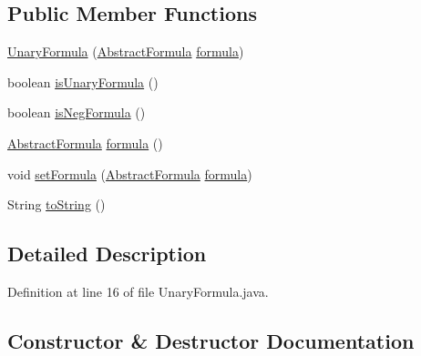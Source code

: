 \subsection*{Public Member Functions}
\begin{DoxyCompactItemize}
\item 
\hyperlink{classuran_1_1formula_1_1_unary_formula_adf82e120cae0b8fe597e3ffffaf22793}{Unary\+Formula} (\hyperlink{classuran_1_1formula_1_1_abstract_formula}{Abstract\+Formula} \hyperlink{classuran_1_1formula_1_1_unary_formula_a348d9e263106ff6085e47c01e15737e2}{formula})
\item 
boolean \hyperlink{classuran_1_1formula_1_1_unary_formula_aacf9ae3900679c8adbc5f26a92f90317}{is\+Unary\+Formula} ()
\item 
boolean \hyperlink{classuran_1_1formula_1_1_unary_formula_a1e44e55276a395446aa3615245790a95}{is\+Neg\+Formula} ()
\item 
\hyperlink{classuran_1_1formula_1_1_abstract_formula}{Abstract\+Formula} \hyperlink{classuran_1_1formula_1_1_unary_formula_a348d9e263106ff6085e47c01e15737e2}{formula} ()
\item 
void \hyperlink{classuran_1_1formula_1_1_unary_formula_a2d0a4512e7e27758ec8abbd2112623f5}{set\+Formula} (\hyperlink{classuran_1_1formula_1_1_abstract_formula}{Abstract\+Formula} \hyperlink{classuran_1_1formula_1_1_unary_formula_a348d9e263106ff6085e47c01e15737e2}{formula})
\item 
String \hyperlink{classuran_1_1formula_1_1_unary_formula_afa835fcef33e2351e22912f68d0693bb}{to\+String} ()
\end{DoxyCompactItemize}


\subsection{Detailed Description}


Definition at line 16 of file Unary\+Formula.\+java.



\subsection{Constructor \& Destructor Documentation}
\hypertarget{classuran_1_1formula_1_1_unary_formula_adf82e120cae0b8fe597e3ffffaf22793}{}

